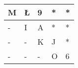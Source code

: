 \begin{tabular}{|l|l|l|l|l|}
\hline
M & Ł & 9 & * & * \\ \hline
- & I & A & * & * \\ \hline
- & - & K & J & * \\ \hline
- & - & - & O & 6 \\ \hline
\end{tabular}